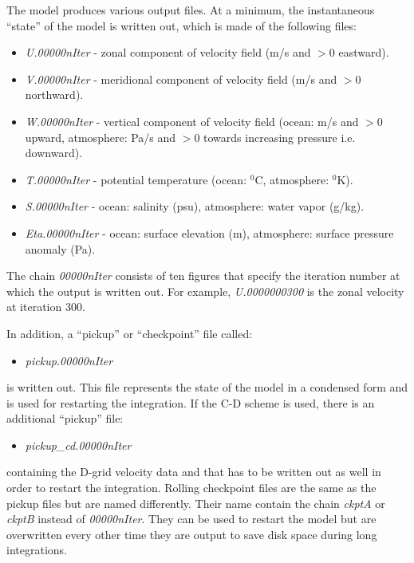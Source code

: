 The model produces various output files. At a minimum, the instantaneous
``state'' of the model is written out, which is made of the following files:

\begin{itemize}
\item \textit{U.00000nIter} - zonal component of velocity field (m/s and $>
0 $ eastward).

\item \textit{V.00000nIter} - meridional component of velocity field (m/s
and $> 0$ northward).

\item \textit{W.00000nIter} - vertical component of velocity field (ocean:
m/s and $> 0$ upward, atmosphere: Pa/s and $> 0$ towards increasing pressure
i.e. downward).

\item \textit{T.00000nIter} - potential temperature (ocean: $^{0}$C,
atmosphere: $^{0}$K).

\item \textit{S.00000nIter} - ocean: salinity (psu), atmosphere: water vapor
(g/kg).

\item \textit{Eta.00000nIter} - ocean: surface elevation (m), atmosphere:
surface pressure anomaly (Pa).
\end{itemize}

The chain \textit{00000nIter} consists of ten figures that specify the
iteration number at which the output is written out. For example, \textit{%
U.0000000300} is the zonal velocity at iteration 300.

In addition, a ``pickup'' or ``checkpoint'' file called:

\begin{itemize}
\item \textit{pickup.00000nIter}
\end{itemize}

is written out. This file represents the state of the model in a condensed
form and is used for restarting the integration. If the C-D scheme is used,
there is an additional ``pickup'' file:

\begin{itemize}
\item \textit{pickup\_cd.00000nIter}
\end{itemize}

containing the D-grid velocity data and that has to be written out as well
in order to restart the integration. Rolling checkpoint files are the same
as the pickup files but are named differently. Their name contain the chain 
\textit{ckptA} or \textit{ckptB} instead of \textit{00000nIter}. They can be
used to restart the model but are overwritten every other time they are
output to save disk space during long integrations.

